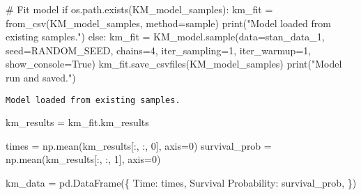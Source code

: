 \documentclass[
  letterpaper,
  DIV=11,
  numbers=noendperiod]{scrartcl}
\newenvironment{Shaded}{\begin{snugshade}}{\end{snugshade}}
\newcommand{\BuiltInTok}[1]{\textcolor[rgb]{0.00,0.23,0.31}{#1}}
\newcommand{\CommentTok}[1]{\textcolor[rgb]{0.37,0.37,0.37}{#1}}
\newcommand{\ControlFlowTok}[1]{\textcolor[rgb]{0.00,0.23,0.31}{#1}}
\newcommand{\DecValTok}[1]{\textcolor[rgb]{0.68,0.00,0.00}{#1}}
\newcommand{\NormalTok}[1]{\textcolor[rgb]{0.00,0.23,0.31}{#1}}
\newcommand{\OperatorTok}[1]{\textcolor[rgb]{0.37,0.37,0.37}{#1}}
\newcommand{\StringTok}[1]{\textcolor[rgb]{0.13,0.47,0.30}{#1}}
\newcommand{\VariableTok}[1]{\textcolor[rgb]{0.07,0.07,0.07}{#1}}
\begin{document}
\begin{Shaded}
\begin{Highlighting}[]
\CommentTok{\# Fit model}
\ControlFlowTok{if}\NormalTok{ os.path.exists(KM\_model\_samples):}
\NormalTok{    km\_fit }\OperatorTok{=}\NormalTok{ from\_csv(KM\_model\_samples, method}\OperatorTok{=}\StringTok{\textquotesingle{}sample\textquotesingle{}}\NormalTok{)}
    \BuiltInTok{print}\NormalTok{(}\StringTok{"Model loaded from existing samples."}\NormalTok{)}
\ControlFlowTok{else}\NormalTok{:}
\NormalTok{    km\_fit }\OperatorTok{=}\NormalTok{ KM\_model.sample(data}\OperatorTok{=}\NormalTok{stan\_data\_1, seed}\OperatorTok{=}\NormalTok{RANDOM\_SEED, chains}\OperatorTok{=}\DecValTok{4}\NormalTok{, iter\_sampling}\OperatorTok{=}\DecValTok{1}\NormalTok{, iter\_warmup}\OperatorTok{=}\DecValTok{1}\NormalTok{, show\_console}\OperatorTok{=}\VariableTok{True}\NormalTok{)}
\NormalTok{    km\_fit.save\_csvfiles(KM\_model\_samples)  }
    \BuiltInTok{print}\NormalTok{(}\StringTok{"Model run and saved."}\NormalTok{)}
\end{Highlighting}
\end{Shaded}

\begin{verbatim}
Model loaded from existing samples.
\end{verbatim}

\begin{Shaded}
\begin{Highlighting}[]
\NormalTok{km\_results }\OperatorTok{=}\NormalTok{ km\_fit.km\_results}

\NormalTok{times }\OperatorTok{=}\NormalTok{ np.mean(km\_results[:, :, }\DecValTok{0}\NormalTok{], axis}\OperatorTok{=}\DecValTok{0}\NormalTok{)}
\NormalTok{survival\_prob }\OperatorTok{=}\NormalTok{ np.mean(km\_results[:, :, }\DecValTok{1}\NormalTok{], axis}\OperatorTok{=}\DecValTok{0}\NormalTok{)}
  

\NormalTok{km\_data }\OperatorTok{=}\NormalTok{ pd.DataFrame(\{}
    \StringTok{\textquotesingle{}Time\textquotesingle{}}\NormalTok{: times,}
    \StringTok{\textquotesingle{}Survival Probability\textquotesingle{}}\NormalTok{: survival\_prob,}
\NormalTok{\})}
\end{Highlighting}
\end{Shaded}
\end{document}
